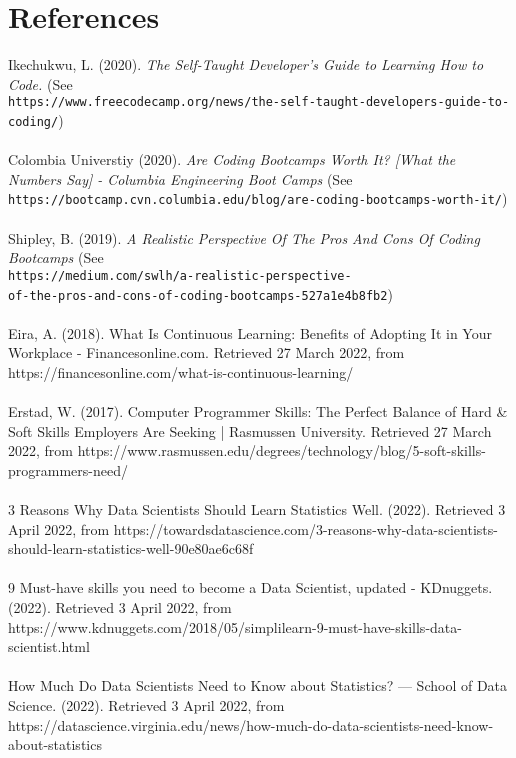 \documentclass[a4paper, 11pt]{report}
\begin{document}
	\section{References}
	Ikechukwu, L. (2020). \textit{The Self-Taught Developer's Guide to Learning How to Code.} (See\\ \texttt{https://www.freecodecamp.org/news/the-self-taught-developers-guide-to-coding/})
	\\
	\\
	Colombia Universtiy (2020). \textit{Are Coding Bootcamps Worth It? [What the Numbers Say] - Columbia Engineering Boot Camps} (See\\ \texttt{https://bootcamp.cvn.columbia.edu/blog/are-coding-bootcamps-worth-it/})
	\\
	\\
	Shipley, B. (2019). \textit{A Realistic Perspective Of The Pros And Cons Of Coding Bootcamps} (See\\ \texttt{https://medium.com/swlh/a-realistic-perspective-\\
		of-the-pros-and-cons-of-coding-bootcamps-527a1e4b8fb2})
	\\
	\\
	Eira, A. (2018). What Is Continuous Learning: Benefits of Adopting It in Your Workplace - Financesonline.com. Retrieved 27 March 2022, from https://financesonline.com/what-is-continuous-learning/
	\\
	\\
	Erstad, W. (2017). Computer Programmer Skills: The Perfect Balance of Hard \& Soft Skills Employers Are Seeking | Rasmussen University. Retrieved 27 March 2022, from https://www.rasmussen.edu/degrees/technology/blog/5-soft-skills-programmers-need/
	\\
	\\
	3 Reasons Why Data Scientists Should Learn Statistics Well. (2022). Retrieved 3 April 2022, from https://towardsdatascience.com/3-reasons-why-data-scientists-should-learn-statistics-well-90e80ae6c68f
	\\
	\\
	9 Must-have skills you need to become a Data Scientist, updated - KDnuggets. (2022). Retrieved 3 April 2022, from https://www.kdnuggets.com/2018/05/simplilearn-9-must-have-skills-data-scientist.html
	\\
	\\
	How Much Do Data Scientists Need to Know about Statistics? — School of Data Science. (2022). Retrieved 3 April 2022, from https://datascience.virginia.edu/news/how-much-do-data-scientists-need-know-about-statistics
\end{document}
